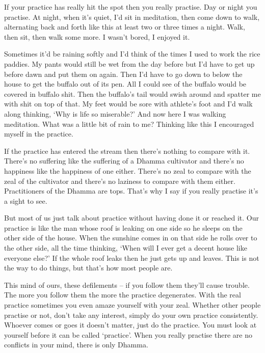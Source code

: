If your practice has really hit the spot then you really practise. Day or night you practise. At night, when it's quiet, I'd sit in meditation, then come down to walk, alternating back and forth like this at least two or three times a night. Walk, then sit, then walk some more. I wasn't bored, I enjoyed it. 

Sometimes it'd be raining softly and I'd think of the times I used to work the rice paddies. My pants would still be wet from the day before but I'd have to get up before dawn and put them on again. Then I'd have to go down to below the house to get the buffalo out of its pen. All I could see of the buffalo would be covered in buffalo shit. Then the buffalo's tail would swish around and spatter me with shit on top of that. My feet would be sore with athlete's foot and I'd walk along thinking, `Why is life so miserable?' And now here I was walking meditation. What was a little bit of rain to me? Thinking like this I encouraged myself in the practice. 

If the practice has entered the stream then there's nothing to compare with it. There's no suffering like the suffering of a Dhamma cultivator and there's no happiness like the happiness of one either. There's no zeal to compare with the zeal of the cultivator and there's no laziness to compare with them either. Practitioners of the Dhamma are tops. That's why I say if you really practise it's a sight to see. 

But most of us just talk about practice without having done it or reached it. Our practice is like the man whose roof is leaking on one side so he sleeps on the other side of the house. When the sunshine comes in on that side he rolls over to the other side, all the time thinking, `When will I ever get a decent house like everyone else?' If the whole roof leaks then he just gets up and leaves. This is not the way to do things, but that's how most people are. 

This mind of ours, these defilements -- if you follow them they'll cause trouble. The more you follow them the more the practice degenerates. With the real practice sometimes you even amaze yourself with your zeal. Whether other people practise or not, don't take any interest, simply do your own practice consistently. Whoever comes or goes it doesn't matter, just do the practice. You must look at yourself before it can be called `practice'. When you really practise there are no conflicts in your mind, there is only Dhamma. 

